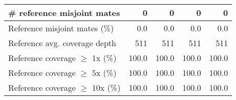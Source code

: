 \documentclass[12pt,a4paper]{article}
\begin{document}
\begin{table}[ht]
\begin{center}
\begin{tabular}{|l*{4}{|r}|}
\# reference misjoint mates & 0 & 0 & 0 & 0 \\ \hline
Reference misjoint mates (\%) & 0.0 & 0.0 & 0.0 & 0.0 \\ \hline
Reference avg. coverage depth & 511 & 511 & 511 & 511 \\ \hline
Reference coverage $\geq$ 1x (\%) & 100.0 & 100.0 & 100.0 & 100.0 \\ \hline
Reference coverage $\geq$ 5x (\%) & 100.0 & 100.0 & 100.0 & 100.0 \\ \hline
Reference coverage $\geq$ 10x (\%) & 100.0 & 100.0 & 100.0 & 100.0 \\ \hline
\end{tabular}
\end{center}
\end{table}
\end{document}
